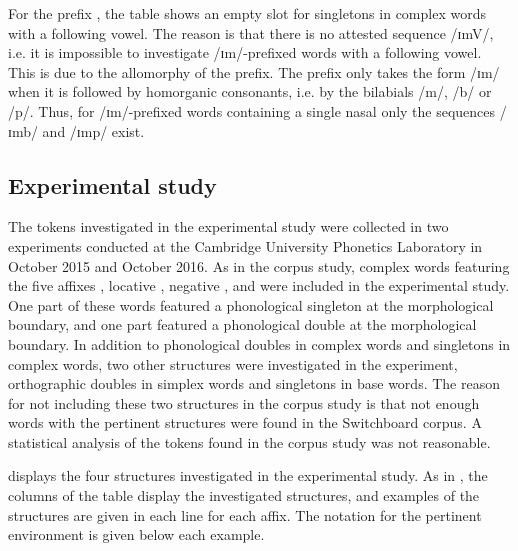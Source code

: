 For the prefix  , the table shows an empty slot for singletons in complex words with a following vowel. The reason is that there is no attested sequence /ɪmV/, i.e. it is impossible to investigate /ɪm/-prefixed words with a following vowel. This is due to the allomorphy of the prefix. The prefix   only takes the form /ɪm/ when it is followed by homorganic consonants, i.e. by the bilabials /m/, /b/ or /p/. Thus, for /ɪm/-prefixed words containing a single nasal only the sequences /ɪmb/ and /ɪmp/ exist. 



\subsection{Experimental study}\label{experiment data composition}

The tokens investigated in the experimental study were collected in two experiments conducted at the Cambridge University Phonetics Laboratory in October 2015 and October 2016. 
 As in the corpus study, complex words featuring the five affixes , locative , negative ,  and  were included  in the experimental study. One part of these words featured a phonological singleton at the morphological boundary, and one part  featured a phonological double at the morphological boundary. In addition to phonological doubles in complex words and singletons in complex words, two other structures were investigated in the experiment, orthographic doubles in simplex words and singletons in base words. The reason for not including these two structures in the corpus study is that not enough words with the pertinent structures were found in the Switchboard corpus. A statistical analysis of the tokens found in the corpus study was not reasonable.
 
  displays the four structures investigated in the experimental study. As in , the columns of the table display the investigated structures, and examples of the structures are given in each line for each affix. The notation for the pertinent environment is given below each example. 
 
 

